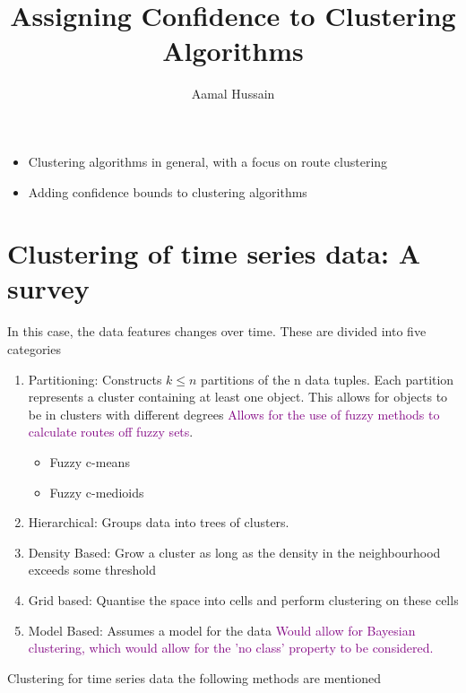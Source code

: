 \documentclass{article}
\title{Assigning Confidence to Clustering Algorithms}
\author{Aamal Hussain}
\newcommand\NOTE[1]{\textcolor{purple}{#1}}
\begin{document}
    \maketitle

    \begin{itemize}
        \item Clustering algorithms in general, with a focus on route clustering
        \item Adding confidence bounds to clustering algorithms
    \end{itemize}

    \section{Clustering of time series data: A survey}

    In this case, the data features changes over time. These are divided into five categories

    \begin{enumerate}
        \item Partitioning: Constructs $k \leq n$ partitions of the n data tuples. Each partition represents a cluster containing at least one object. This allows for objects to be in clusters with different degrees \NOTE{Allows for the use of fuzzy methods to calculate routes off fuzzy sets}.
        \begin{itemize}
            \item Fuzzy c-means
            \item Fuzzy c-medioids
        \end{itemize}
        \item Hierarchical: Groups data into trees of clusters. 
        \item Density Based: Grow a cluster as long as the density in the neighbourhood exceeds some threshold
        \item Grid based: Quantise the space into cells and perform clustering on these cells
        \item Model Based: Assumes a model for the data \NOTE{Would allow for Bayesian clustering, which would allow for the 'no class' property to be considered.} 
    \end{enumerate}

    Clustering for time series data the following methods are mentioned
\end{document}
